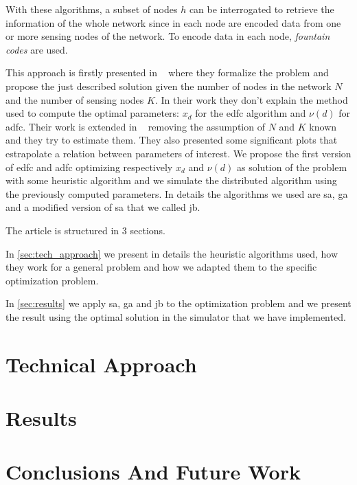 \documentclass[journal]{IEEEtran}
\begin{document}
With these algorithms, a subset of nodes $h$ can be interrogated to retrieve the information of the whole network since in each node are encoded data from one or more sensing nodes of the network.
To encode data in each node, \textit{fountain codes} are used.

This approach is firstly presented in ~\cite{Lin2007} where they formalize the problem and propose the just described solution given the number of nodes in the network $N$ and the number of sensing nodes $K$. In their work they don't explain the method used to compute the optimal parameters: $x_d$ for the \gls{edfc} algorithm and $\nu(d)$ for \gls{adfc}. Their work is extended in ~\cite{Aly2008} removing the assumption of $N$ and $K$ known and they try to estimate them.
They also presented some significant plots that estrapolate a relation between parameters of interest.
We propose the first version of \gls{edfc} and \gls{adfc} optimizing respectively $x_d$ and $\nu(d)$ as solution of the problem with some heuristic algorithm and we simulate the distributed algorithm using the previously computed parameters.
In details the algorithms we used are \gls{sa}, \gls{ga} and a modified version of \gls{sa} that we called \gls{jb}.

The article is structured in 3 sections.

In \autoref{sec:tech_approach} we present in details the heuristic algorithms used, how they work for a general problem and how we adapted them to the specific optimization problem.

In \autoref{sec:results} we apply \gls{sa}, \gls{ga} and \gls{jb} to the optimization problem and we present the result using the optimal solution in the simulator that we have implemented.

\section{Technical Approach}
\label{sec:tech_approach}

\section{Results}
\label{sec:results}

\section{Conclusions And Future Work}
\label{sec:conclusions}



\end{document}

